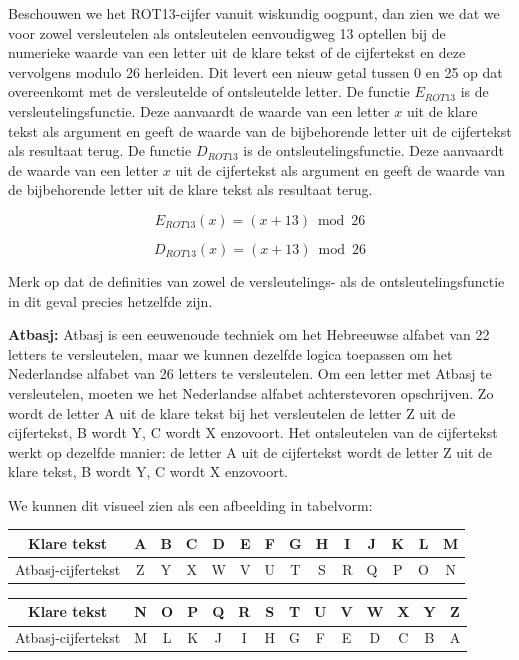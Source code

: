 Beschouwen we het ROT13-cijfer vanuit wiskundig oogpunt, dan zien we dat we voor zowel versleutelen als ontsleutelen eenvoudigweg 13 optellen bij de numerieke waarde van een letter uit de klare tekst of de cijfertekst en deze vervolgens modulo 26 herleiden. Dit levert een nieuw getal tussen 0 en 25 op dat overeenkomt met de versleutelde of ontsleutelde letter. De functie $E_{ROT13}$ is de versleutelingsfunctie. Deze aanvaardt de waarde van een letter $x$ uit de klare tekst als argument en geeft de waarde van de bijbehorende letter uit de cijfertekst als resultaat terug. De functie $D_{ROT13}$ is de ontsleutelingsfunctie. Deze aanvaardt de waarde van een letter $x$ uit de cijfertekst als argument en geeft de waarde van de bijbehorende letter uit de klare tekst als resultaat terug.

\[
  E_{ROT13}(x) = (x + 13) \bmod 26
\]

\[
  D_{ROT13}(x) = (x + 13) \bmod 26
\]

Merk op dat de definities van zowel de versleutelings- als de ontsleutelingsfunctie in dit geval precies hetzelfde zijn.

{\bf Atbasj:} Atbasj is een eeuwenoude techniek om het Hebreeuwse alfabet van 22 letters te versleutelen, maar we kunnen dezelfde logica toepassen om het Nederlandse alfabet van 26 letters te versleutelen. Om een letter met Atbasj te versleutelen, moeten we het Nederlandse alfabet achterstevoren opschrijven. Zo wordt de letter A uit de klare tekst bij het versleutelen de letter Z uit de cijfertekst, B wordt Y, C wordt X enzovoort. Het ontsleutelen van de cijfertekst werkt op dezelfde manier: de letter A uit de cijfertekst wordt de letter Z uit de klare tekst, B wordt Y, C wordt X enzovoort.

We kunnen dit visueel zien als een afbeelding in tabelvorm:

\Large
\begin{center}
  \begin{tabular}{|c|c|c|c|c|c|c|c|c|c|c|c|c|c|}
  \hline
    Klare tekst & A & B & C & D & E & F & G & H & I & J & K & L & M \\ \hline	Atbasj-cijfertekst & Z & Y & X & W & V & U & T & S & R & Q & P & O & N \\ \hline
  \end{tabular}
\end{center}

\begin{center}
  \begin{tabular}{|c|c|c|c|c|c|c|c|c|c|c|c|c|c|}
  \hline
    Klare tekst & N & O & P & Q & R & S & T & U & V & W & X & Y & Z \\ \hline    Atbasj-cijfertekst & M & L & K & J & I & H & G & F & E & D & C & B & A \\ \hline
  \end{tabular}
\end{center}

